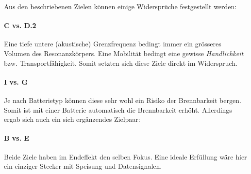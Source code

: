 Aus den beschriebenen Zielen können einige Widersprüche festgestellt werden:
\paragraph{C vs. D.2} Eine tiefe untere (akustische) Grenzfrequenz bedingt immer ein grösseres Volumen des Resonanzkörpers. Eine Mobilität bedingt eine gewisse \textit{Handlichkeit} bzw. Transportfähigkeit. Somit setzten sich diese Ziele direkt im Widerspruch.
\paragraph{I vs. G} Je nach Batterietyp können diese sehr wohl ein Risiko der Brennbarkeit bergen. Somit ist mit einer Batterie automatisch die Brennbarkeit erhöht.
Allerdings ergab sich auch ein sich ergänzendes Zielpaar:
\paragraph{B vs. E} Beide Ziele haben im Endeffekt den selben Fokus. Eine ideale Erfüllung wäre hier ein einziger Stecker mit Speisung und Datensignalen.